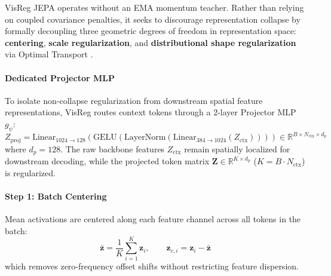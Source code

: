 \documentclass{article}
\begin{document}
VisReg JEPA \citep{wu2026visreg} operates without an EMA momentum teacher. Rather than relying on coupled covariance penalties, it seeks to discourage representation collapse by formally decoupling three geometric degrees of freedom in representation space: \textbf{centering}, \textbf{scale regularization}, and \textbf{distributional shape regularization} via Optimal Transport \citep{bonneel2015sliced,villani2009optimal}.

\paragraph{Dedicated Projector MLP}
To isolate non-collapse regularization from downstream spatial feature representations, VisReg routes context tokens through a 2-layer Projector MLP $g_\psi$:
\begin{equation}
    Z_{\text{proj}} = \text{Linear}_{1024 \to 128}\left(\text{GELU}\left(\text{LayerNorm}\left(\text{Linear}_{384 \to 1024}(Z_{\text{ctx}})\right)\right)\right) \in \mathbb{R}^{B \times N_{\text{ctx}} \times d_p}
\end{equation}
where $d_p = 128$. The raw backbone features $Z_{\text{ctx}}$ remain spatially localized for downstream decoding, while the projected token matrix $\mathbf{Z} \in \mathbb{R}^{K \times d_p}$ ($K = B \cdot N_{\text{ctx}}$) is regularized.

\paragraph{Step 1: Batch Centering}
Mean activations are centered along each feature channel across all tokens in the batch:
\begin{equation}
    \bar{\mathbf{z}} = \frac{1}{K} \sum_{i=1}^K \mathbf{z}_i, \qquad \mathbf{z}_{c, i} = \mathbf{z}_i - \bar{\mathbf{z}}
\end{equation}
which removes zero-frequency offset shifts without restricting feature dispersion.
\end{document}
